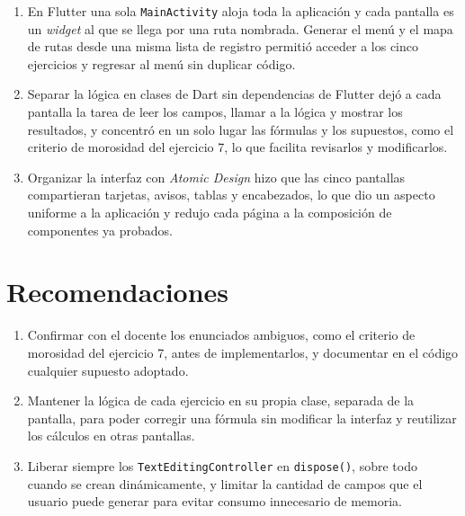 \documentclass[12pt,a4paper]{article}
\begin{document}
\begin{enumerate}[leftmargin=1.5cm]
  \item En Flutter una sola \texttt{MainActivity} aloja toda la aplicación y cada pantalla es un \textit{widget} al que se llega por una ruta nombrada. Generar el menú y el mapa de rutas desde una misma lista de registro permitió acceder a los cinco ejercicios y regresar al menú sin duplicar código.
  \item Separar la lógica en clases de Dart sin dependencias de Flutter dejó a cada pantalla la tarea de leer los campos, llamar a la lógica y mostrar los resultados, y concentró en un solo lugar las fórmulas y los supuestos, como el criterio de morosidad del ejercicio 7, lo que facilita revisarlos y modificarlos.
  \item Organizar la interfaz con \textit{Atomic Design} hizo que las cinco pantallas compartieran tarjetas, avisos, tablas y encabezados, lo que dio un aspecto uniforme a la aplicación y redujo cada página a la composición de componentes ya probados.
\end{enumerate}

\section{Recomendaciones}

\begin{enumerate}[leftmargin=1.5cm]
  \item Confirmar con el docente los enunciados ambiguos, como el criterio de morosidad del ejercicio 7, antes de implementarlos, y documentar en el código cualquier supuesto adoptado.
  \item Mantener la lógica de cada ejercicio en su propia clase, separada de la pantalla, para poder corregir una fórmula sin modificar la interfaz y reutilizar los cálculos en otras pantallas.
  \item Liberar siempre los \texttt{TextEditingController} en \texttt{dispose()}, sobre todo cuando se crean dinámicamente, y limitar la cantidad de campos que el usuario puede generar para evitar consumo innecesario de memoria.
\end{enumerate}
\end{document}
